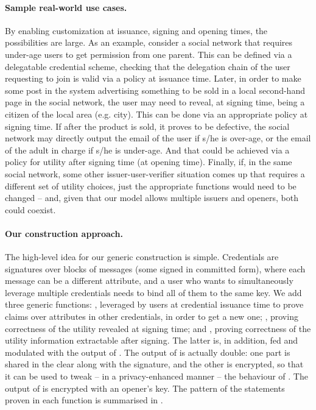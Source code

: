 \paragraph{Sample real-world use cases.} %
By enabling customization at issuance, signing and opening times, the
possibilities are large. As an example, consider a social network that requires
under-age users to get permission from one parent. This can be defined via a
delegatable credential scheme, checking that the delegation chain of the user
requesting to join is valid via a policy at issuance time. Later, in order to
make some post in the system advertising something to be sold in a local
second-hand page in the social network, the user may need to reveal, at signing
time, being a citizen of the local area (e.g. city). This can be done via an
appropriate policy at signing time. If after the product is sold, it proves
to be defective, the social network may directly output the email of the user
if s/he is over-age, or the email of the adult in charge if s/he is under-age.
And that could be achieved via a policy for utility after signing time (at
opening time). Finally, if, in the same social network, some other
issuer-user-verifier situation comes up that requires a different set of utility
choices, just the appropriate functions would need to be changed -- and, given
that our model allows multiple issuers and openers, both could coexist.

\paragraph{Our construction approach.} %
The high-level idea for our generic construction \CUASGen is simple. Credentials
are signatures over blocks of messages (some signed in committed form), where
each message can be a different attribute, and a user who wants to
simultaneously leverage multiple credentials needs to bind all of them to the
same key. We add three generic functions: \fissue, leveraged by users at
credential issuance time to prove claims over attributes in other credentials,
in order to get a new one; \feval, proving correctness of the utility revealed
at signing time; and \finsp, proving correctness of the utility information
extractable after signing. The latter is, in addition, fed and modulated with
the output of \feval. The output of \feval is
actually double: one part is shared in the clear along with the signature, and
the other is encrypted, so that it can be used to tweak -- in a privacy-enhanced
manner -- the behaviour of \finsp. The output of \finsp is encrypted with an
opener's key. The pattern of the statements proven in each function is
summarised in .


